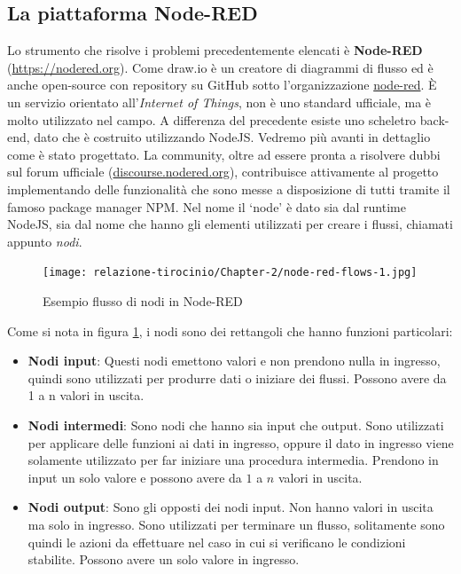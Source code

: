 \documentclass[a4paper,10pt]{memoir}
\begin{document}
\subsection{La piattaforma Node-RED}
Lo strumento che risolve i problemi precedentemente elencati è \textbf{Node-RED} (\href{https://nodered.org}{https://nodered.org}).
Come draw.io è un creatore di diagrammi di flusso ed è anche open-source con repository su GitHub sotto l'organizzazione \href{https://github.com/node-red}{node-red}. È un servizio orientato all'\textit{Internet of Things}, non è uno standard ufficiale, ma è molto utilizzato nel campo.
A differenza del precedente esiste uno scheletro back-end, dato che è costruito utilizzando NodeJS. Vedremo più avanti in dettaglio come è stato progettato.
La community, oltre ad essere pronta a risolvere dubbi sul forum ufficiale (\href{https://discourse.nodered.org}{discourse.nodered.org}), contribuisce attivamente al progetto implementando delle funzionalità che sono messe a disposizione di tutti tramite il famoso package manager NPM.
Nel nome il `node' è dato sia dal runtime NodeJS, sia dal nome che hanno gli elementi utilizzati per creare i flussi, chiamati appunto \textit{nodi}.
\begin{figure}[H]
\caption{Esempio flusso di nodi in Node-RED}
\label{fig:node-red-flows-example1}
\texttt{[image: relazione-tirocinio/Chapter-2/node-red-flows-1.jpg]}
\end{figure}
Come si nota in figura \ref{fig:node-red-flows-example1}, i nodi sono dei rettangoli che hanno funzioni particolari:
\begin{itemize}
    \item \textbf{Nodi input}: Questi nodi emettono valori e non prendono nulla in ingresso, quindi sono utilizzati per produrre dati o iniziare dei flussi. Possono avere da 1 a n valori in uscita.
    \item \textbf{Nodi intermedi}: Sono nodi che hanno sia input che output. Sono utilizzati per applicare delle funzioni ai dati in ingresso, oppure il dato in ingresso viene solamente utilizzato per far iniziare una procedura intermedia. Prendono in input un solo valore e possono avere da $1$ a $n$ valori in uscita.
    \item \textbf{Nodi output}: Sono gli opposti dei nodi input. Non hanno valori in uscita ma solo in ingresso. Sono utilizzati per terminare un flusso, solitamente sono quindi le azioni da effettuare nel caso in cui si verificano le condizioni stabilite. Possono avere un solo valore in ingresso.
\end{itemize}
\end{document}

